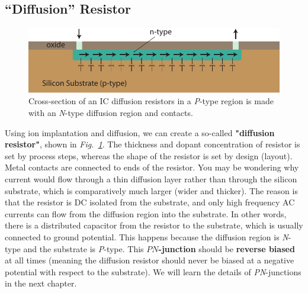 \subsection{“Diffusion” Resistor}
\begin{figure}[tb]
\centering
\includegraphics[width=.7\columnwidth]{diff_resistor}
\caption{Cross-section of an IC diffusion resistors in a \emph{P}-type region is made with an \emph{N}-type diffusion region and contacts.}
\label{fig:mod2-2_ICtech_sld_5}
\end{figure}
Using ion implantation and diffusion, we can create a so-called \textbf{"diffusion resistor"}, shown in \emph{Fig.~\ref{fig:mod2-2_ICtech_sld_5}}.  The thickness and dopant concentration of resistor is set by process steps, whereas the shape of the resistor is set by design (layout).   Metal contacts are connected to ends of the resistor.  You may be wondering why current would flow through a thin diffusion layer rather than through the silicon substrate, which is comparatively much larger (wider and thicker).  The reason is that the resistor is DC isolated from the substrate, and only high frequency AC currents can flow from the diffusion region into the substrate.  In other words, there is a distributed capacitor from the resistor to the substrate, which is usually connected to ground potential.  This happens because the diffusion region is \emph{N}-type and the substrate is \emph{P}-type.  This \textbf{$PN$-junction} should be \textbf{reverse biased} at all times (meaning the diffusion resistor should never be biased at a negative potential with respect to the substrate).  We will learn the details of \emph{PN}-junctions in the next chapter.
